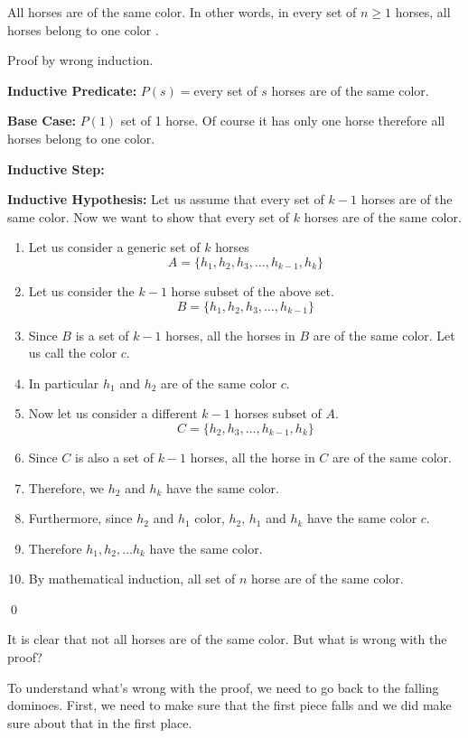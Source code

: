 \documentclass[a4paper, 12pt]{article}
\newcommand{\theorem}{\noindent\textbf{Theorem:} }
\newcommand{\predicate}{\noindent\textbf{Inductive Predicate:} }
\newcommand{\inductivestep}{\noindent\textbf{Inductive Step:} }
\renewcommand{\proof}{\noindent\textbf{Proof:} }
\newcommand{\basecase}{\noindent\textbf{Base Case:} }
\newcommand{\inductivehypothesis}{\noindent\textbf{Inductive Hypothesis:} }
\newcommand{\qedd}{\qed\newline}
\theoremstyle{examplestyle}
\begin{document}
\begin{multicols}{2}
\textcolor{red}{\cancel{\theorem}} All horses are of the same color. In other words, in every set of $n\ge 1$ horses, all horses belong to one color \checkmark.


\textcolor{red}{\cancel{\proof}} Proof by wrong induction.

\predicate $P(s) = $every set of $s$ horses are of the same color.

\basecase $P(1)$ set of 1 horse. Of course it has only one horse therefore all horses belong to one color.

\inductivestep

\inductivehypothesis Let us assume that every set of $k-1$ horses are of the same color. Now we want to show that every set of $k$ horses are of the same color.
\begin{enumerate}
\item Let us consider a generic set of $k$ horses
\[
A = \{h_1, h_2, h_3, \ldots, h_{k-1}, h_{k}\}
\]

\item Let us consider the $k-1$ horse subset of the above set.
\[
B = \{h_1, h_2, h_3, \ldots, h_{k-1}\}	
\]

\item Since $B$ is a set of $k-1$ horses, all the horses in $B$ are of the same color. Let us call the color $c$.

\item\label{bad} In particular $h_1$ and $h_2$ are of the same color $c$.

\item Now let us consider a different $k-1$ horses subset of $A$.
\[
C = \{h_2, h_3, \ldots, h_{k-1},h_{k}\}	
\]
\item Since $C$ is also a set of $k-1$ horses, all the horse in $C$ are of the same color.

\item Therefore, we $h_2$ and $h_k$ have the same color.
\item Furthermore, since $h_2$ and $h_1$ color, $h_2$, $h_1$ and $h_k$ have the same color $c$.
\item Therefore $h_1, h_2, \ldots h_k$ have the same color.
\item By mathematical induction, all set of $n$ horse are of the same color.
\end{enumerate}
\qedd

It is clear that not all horses are of the same color. But what is wrong with the proof?

To understand what's wrong with the proof, we need to go back to the falling dominoes. First, we need to make sure that the first piece falls and we did make sure about that in the first place.


\end{multicols}
\end{document}
